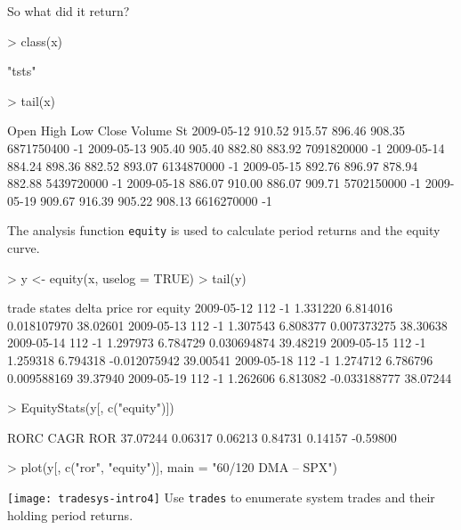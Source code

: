 \documentclass[a4]{article}
\newcommand{\code}[1]{\texttt{#1}}
\begin{document}
So what did it return?
\begin{Schunk}
\begin{Sinput}
> class(x)
\end{Sinput}
\begin{Soutput}
[1] "tsts"
\end{Soutput}
\begin{Sinput}
> tail(x)
\end{Sinput}
\begin{Soutput}
             Open   High    Low  Close     Volume St
2009-05-12 910.52 915.57 896.46 908.35 6871750400 -1
2009-05-13 905.40 905.40 882.80 883.92 7091820000 -1
2009-05-14 884.24 898.36 882.52 893.07 6134870000 -1
2009-05-15 892.76 896.97 878.94 882.88 5439720000 -1
2009-05-18 886.07 910.00 886.07 909.71 5702150000 -1
2009-05-19 909.67 916.39 905.22 908.13 6616270000 -1
\end{Soutput}
\end{Schunk}
The analysis function \code{equity} is used to calculate period
returns and the equity curve.
\begin{Schunk}
\begin{Sinput}
> y <- equity(x, uselog = TRUE)
> tail(y)
\end{Sinput}
\begin{Soutput}
           trade states    delta    price          ror   equity
2009-05-12   112     -1 1.331220 6.814016  0.018107970 38.02601
2009-05-13   112     -1 1.307543 6.808377  0.007373275 38.30638
2009-05-14   112     -1 1.297973 6.784729  0.030694874 39.48219
2009-05-15   112     -1 1.259318 6.794318 -0.012075942 39.00541
2009-05-18   112     -1 1.274712 6.786796  0.009588169 39.37940
2009-05-19   112     -1 1.262606 6.813082 -0.033188777 38.07244
\end{Soutput}
\begin{Sinput}
> EquityStats(y[, c("equity")])
\end{Sinput}
\begin{Soutput}
    RORC     CAGR     ROR%       R2     VOLA    MAXDD 
37.07244  0.06317  0.06213  0.84731  0.14157 -0.59800 
\end{Soutput}
\begin{Sinput}
> plot(y[, c("ror", "equity")], main = "60/120 DMA -- SPX")
\end{Sinput}
\end{Schunk}
\texttt{[image: tradesys-intro4]}
Use \code{trades} to enumerate system trades and their holding
period returns.
\end{document}
